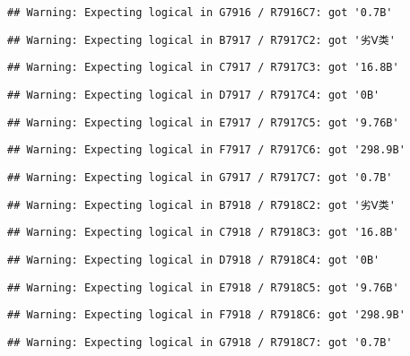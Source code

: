 \documentclass[
]{article}
\begin{document}
\begin{verbatim}
## Warning: Expecting logical in G7916 / R7916C7: got '0.7B'
\end{verbatim}

\begin{verbatim}
## Warning: Expecting logical in B7917 / R7917C2: got '劣Ⅴ类'
\end{verbatim}

\begin{verbatim}
## Warning: Expecting logical in C7917 / R7917C3: got '16.8B'
\end{verbatim}

\begin{verbatim}
## Warning: Expecting logical in D7917 / R7917C4: got '0B'
\end{verbatim}

\begin{verbatim}
## Warning: Expecting logical in E7917 / R7917C5: got '9.76B'
\end{verbatim}

\begin{verbatim}
## Warning: Expecting logical in F7917 / R7917C6: got '298.9B'
\end{verbatim}

\begin{verbatim}
## Warning: Expecting logical in G7917 / R7917C7: got '0.7B'
\end{verbatim}

\begin{verbatim}
## Warning: Expecting logical in B7918 / R7918C2: got '劣Ⅴ类'
\end{verbatim}

\begin{verbatim}
## Warning: Expecting logical in C7918 / R7918C3: got '16.8B'
\end{verbatim}

\begin{verbatim}
## Warning: Expecting logical in D7918 / R7918C4: got '0B'
\end{verbatim}

\begin{verbatim}
## Warning: Expecting logical in E7918 / R7918C5: got '9.76B'
\end{verbatim}

\begin{verbatim}
## Warning: Expecting logical in F7918 / R7918C6: got '298.9B'
\end{verbatim}

\begin{verbatim}
## Warning: Expecting logical in G7918 / R7918C7: got '0.7B'
\end{verbatim}
\end{document}

